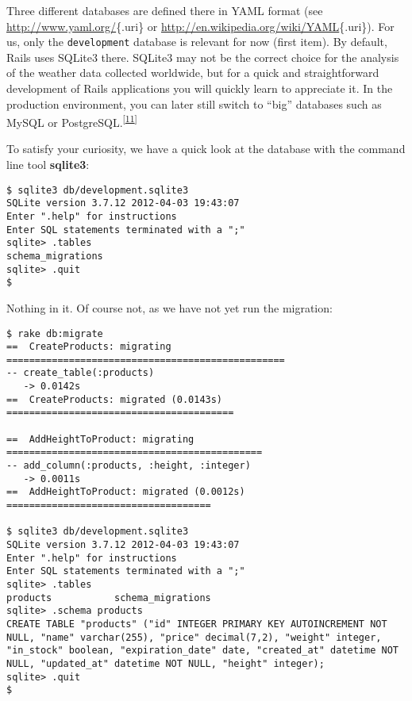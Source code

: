 \documentclass[a4paper]{book}
\newcounter{tab}[chapter]
\begin{document}
Three different databases are defined there in YAML format (see \url{http://www.yaml.org/}\{.uri\} or \url{http://en.wikipedia.org/wiki/YAML}\{.uri\}). For us, only the \texttt{development} database is relevant for now (first item). By default, Rails uses SQLite3 there. SQLite3 may not be the correct choice for the analysis of the weather data collected worldwide, but for a quick and straightforward development of Rails applications you will quickly learn to appreciate it. In the production environment, you can later still switch to “big” databases such as MySQL or PostgreSQL.\textsuperscript{{[}\hyperref[ftn.idp5093968]{11}{]}}

To satisfy your curiosity, we have a quick look at the database with the command line tool \textbf{sqlite3}:

\begin{shaded}\begin{verbatim}
$ sqlite3 db/development.sqlite3
SQLite version 3.7.12 2012-04-03 19:43:07
Enter ".help" for instructions
Enter SQL statements terminated with a ";"
sqlite> .tables
schema_migrations
sqlite> .quit
$
\end{verbatim}\end{shaded}

Nothing in it. Of course not, as we have not yet run the migration:

\begin{shaded}\begin{verbatim}
$ rake db:migrate
==  CreateProducts: migrating =================================================
-- create_table(:products)
   -> 0.0142s
==  CreateProducts: migrated (0.0143s) ========================================

==  AddHeightToProduct: migrating =============================================
-- add_column(:products, :height, :integer)
   -> 0.0011s
==  AddHeightToProduct: migrated (0.0012s) ====================================

$ sqlite3 db/development.sqlite3
SQLite version 3.7.12 2012-04-03 19:43:07
Enter ".help" for instructions
Enter SQL statements terminated with a ";"
sqlite> .tables
products           schema_migrations
sqlite> .schema products
CREATE TABLE "products" ("id" INTEGER PRIMARY KEY AUTOINCREMENT NOT NULL, "name" varchar(255), "price" decimal(7,2), "weight" integer, "in_stock" boolean, "expiration_date" date, "created_at" datetime NOT NULL, "updated_at" datetime NOT NULL, "height" integer);
sqlite> .quit
$
\end{verbatim}\end{shaded}
\end{document}
